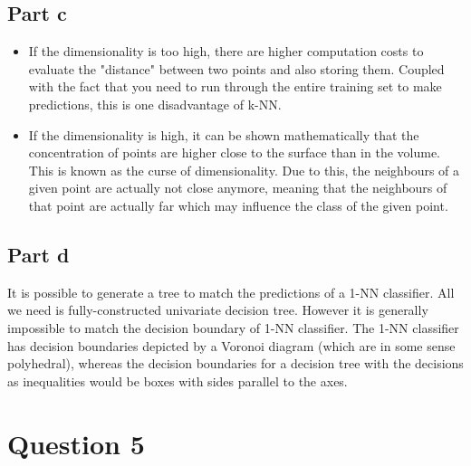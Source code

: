\documentclass{article}
\begin{document}
\subsection*{Part c}
\begin{flushleft}
\begin{itemize}
\item If the dimensionality is too high, there are higher computation costs to evaluate the "distance" between two points and also storing them. Coupled with the fact that you need to run through the entire training set to make predictions, this is one disadvantage of k-NN.
\item If the dimensionality is high, it can be shown mathematically that the concentration of points are higher close to the surface than in the volume. This is known as the curse of dimensionality. Due to this, the neighbours of a given point are actually not close anymore, meaning that the neighbours of that point are actually far which may influence the class of the given point.
\end{itemize}
\end{flushleft}

\subsection*{Part d}
\begin{flushleft}
It is possible to generate a tree to match the predictions of a 1-NN classifier. All we need is fully-constructed univariate decision tree. However it is generally impossible to match the decision boundary of 1-NN classifier. The 1-NN classifier has decision boundaries depicted by a Voronoi diagram (which are in some sense polyhedral), whereas the decision boundaries for a decision tree with the decisions as inequalities would be boxes with sides parallel to the axes.
\end{flushleft}

\section*{Question 5}
\end{document}
